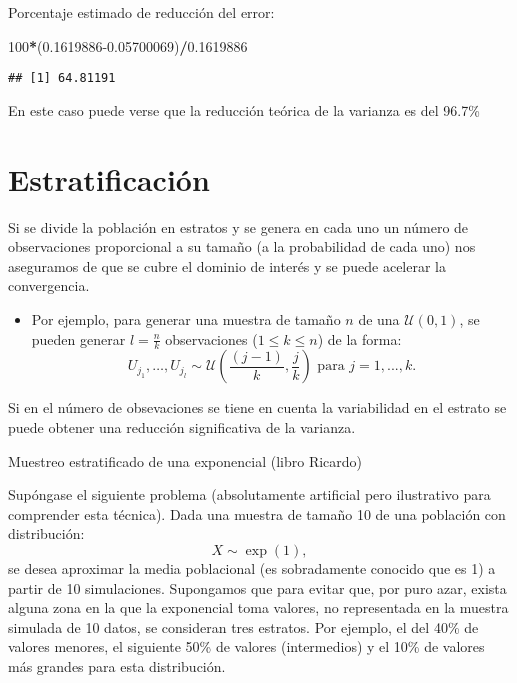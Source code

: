 \documentclass[
]{book}
\newenvironment{Shaded}{\begin{snugshade}}{\end{snugshade}}
\newcommand{\DecValTok}[1]{\textcolor[rgb]{0.00,0.00,0.81}{#1}}
\newcommand{\FloatTok}[1]{\textcolor[rgb]{0.00,0.00,0.81}{#1}}
\newcommand{\NormalTok}[1]{#1}
\newcommand{\OperatorTok}[1]{\textcolor[rgb]{0.81,0.36,0.00}{\textbf{#1}}}
\providecommand{\tightlist}{%
  \setlength{\itemsep}{0pt}\setlength{\parskip}{0pt}}
\theoremstyle{break}
\theoremstyle{definition}
\theoremstyle{definition}
\theoremstyle{definition}
\theoremstyle{remark}
\let\BeginKnitrBlock\begin \let\EndKnitrBlock\end
\begin{document}
Porcentaje estimado de reducción del error:

\begin{Shaded}
\begin{Highlighting}[]
\DecValTok{100}\OperatorTok{*}\NormalTok{(}\FloatTok{0.1619886-0.05700069}\NormalTok{)}\OperatorTok{/}\FloatTok{0.1619886}
\end{Highlighting}
\end{Shaded}

\begin{verbatim}
## [1] 64.81191
\end{verbatim}

En este caso puede verse que la reducción teórica de la varianza es del 96.7\%

\hypertarget{estratificaciuxf3n}{%
\section{Estratificación}\label{estratificaciuxf3n}}

Si se divide la población en estratos y se genera en cada uno un
número de observaciones proporcional a su tamaño (a la probabilidad de cada uno) nos
aseguramos de que se cubre el dominio de interés y se puede acelerar
la convergencia.

\begin{itemize}
\tightlist
\item
  Por ejemplo, para generar una muestra de tamaño \(n\) de una
  \(\mathcal{U}\left( 0,1\right)\), se pueden generar \(l=\frac{n}{k}\)
  observaciones (\(1\leq k\leq n\)) de la forma:
  \[U_{j_{1}},\ldots,U_{j_{l}}\sim \mathcal{U}\left(  \frac{(j-1)}{k},\frac{j}{k}\right)  \text{ para }j=1,...,k.\]
\end{itemize}

Si en el número de obsevaciones se tiene en cuenta la
variabilidad en el estrato se puede obtener una reducción
significativa de la varianza.

\BeginKnitrBlock{example}
\protect\hypertarget{exm:unnamed-chunk-10}{}{\label{exm:unnamed-chunk-10} }Muestreo estratificado de una exponencial (libro Ricardo)
\EndKnitrBlock{example}

Supóngase el siguiente
problema (absolutamente artificial pero ilustrativo para comprender esta
técnica). Dada una muestra de tamaño 10 de una población con
distribución:
\[X \sim \exp\left( 1 \right),\]
se desea aproximar la media
poblacional (es sobradamente conocido que es 1) a partir de 10 simulaciones.
Supongamos que para evitar que, por puro azar, exista alguna zona
en la que la exponencial toma valores, no representada en la muestra simulada
de 10 datos, se consideran tres estratos.
Por ejemplo, el del 40\% de
valores menores, el siguiente 50\% de valores (intermedios) y el 10\% de
valores más grandes para esta distribución.
\end{document}

